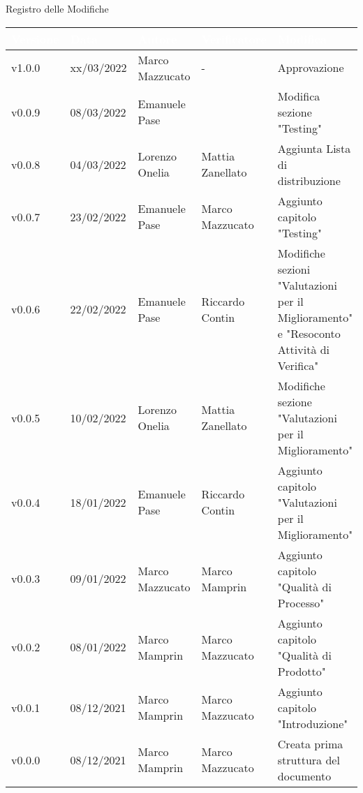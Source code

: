 \begin{center}
  \huge{Registro delle Modifiche}
\end{center}
\renewcommand\arraystretch{1,5}
{\centering
\begin{longtable}{|C{1.8cm}|C{2.1cm}|C{2cm}|C{2.4cm}|L{4.4cm}|}
  \hline
  \textcolor[HTML]{FFFFFF}{\textbf{Versione}} & \textcolor[HTML]{FFFFFF}{\textbf{Data}} & \textcolor[HTML]{FFFFFF}{\textbf{Autore}}  & \textcolor[HTML]{FFFFFF}{\textbf{Verificatore}} & \textcolor[HTML]{FFFFFF}{\textbf{Modifica}}    \\ \hline
  v1.0.0       & xx/03/2022   & Marco Mazzucato & - & Approvazione     \\ \hline
  v0.0.9       & 08/03/2022    & Emanuele Pase  &                        & Modifica sezione "Testing"                   \\ \hline
  v0.0.8       & 04/03/2022    & Lorenzo Onelia  & Mattia Zanellato     & Aggiunta Lista di distribuzione                  \\ \hline
  v0.0.7        & 23/02/2022    & Emanuele Pase    & Marco Mazzucato   & Aggiunto capitolo "Testing"                           \\ \hline
  v0.0.6        & 22/02/2022    & Emanuele Pase     & Riccardo Contin    & Modifiche sezioni "Valutazioni per il Miglioramento" e "Resoconto Attività di Verifica" \\ \hline
  v0.0.5        & 10/02/2022    & Lorenzo Onelia    & Mattia Zanellato   & Modifiche sezione "Valutazioni per il Miglioramento"            \\ \hline
  v0.0.4        & 18/01/2022    & Emanuele Pase     & Riccardo Contin    & Aggiunto capitolo "Valutazioni per il Miglioramento"           \\ \hline
  v0.0.3        & 09/01/2022    & Marco Mazzucato   & Marco Mamprin      & Aggiunto capitolo "Qualità di Processo"                        \\ \hline
  v0.0.2        & 08/01/2022    & Marco Mamprin     & Marco Mazzucato    & Aggiunto capitolo "Qualità di Prodotto"                        \\ \hline
  v0.0.1        & 08/12/2021    & Marco Mamprin     & Marco Mazzucato    & Aggiunto capitolo "Introduzione"                               \\ \hline
  v0.0.0        & 08/12/2021    & Marco Mamprin     & Marco Mazzucato    & Creata prima struttura del documento                           \\ \hline
\end{longtable}}

\renewcommand\arraystretch{1}
